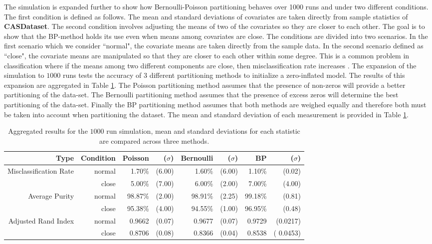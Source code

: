 \documentclass[11pt,letterpaper]{article}
\numberwithin{equation}{section}
\numberwithin{equation}{section}
\numberwithin{equation}{section}
\begin{document}
The simulation is expanded further to show how Bernoulli-Poisson partitioning behaves over 1000 runs and under two different conditions. The first condition is defined as follows. The mean and standard deviations of covariates are taken directly from sample statistics of \textbf{CASDataset}. The second condition involves adjusting the means of two of the covariates so they are closer to each other. The goal is to show that the BP-method holds its use even when means among covariates are close. The conditions are divided into two scenarios. In the first scenario which we consider ``normal", the covariate means are taken directly from the sample data. In the second scenario defined as ``close", the covariate means are manipulated so that they are closer to each other within some degree. This is a common problem in classification where if the means among two different components are close, then misclassification rate increases \citep{LimHwa}. The expansion of the simulation to $1000$ runs tests the accuracy of 3 different partitioning methods to initialize a zero-inflated model. The results of this expansion are aggregated in Table \ref{table:exper2}.  The Poisson partitioning method assumes that the presence of non-zeros will provide a better partitioning of the data-set. The Bernoulli partitioning method assumes that the presence of excess zeros will determine the best partitioning of the data-set. Finally the BP partitioning method assumes that both methods are weighed equally and therefore both must be taken into account when partitioning the dataset. The mean and standard deviation of each measurement is provided in Table \ref{table:exper2}.

\begin{table}[!htb]
\begin{center}
\caption{Aggregated results for the $1000$ run simulation, mean and standard deviations for each statistic are compared across three methods.}
\label{table:exper2}
\begin{tabular}{rrrrrrrr}
\hline\hline
Type   & Condition & Poisson & ($\sigma $) & Bernoulli & ($ \sigma $) & BP & ($ \sigma $) \\
\hline
Misclassification Rate& normal        & 1.70\% & (6.00)       & 1.60\%  & (6.00)         & 1.10\% & (0.02)         \\
       & close      & 5.00\% & (7.00)       & 6.00\% & (2.00)         & 7.00\% & (4.00)         \\
Average Purity & normal     & 98.87\% & (2.00)    & 98.91\% & (2.25)      & 99.18\% & (0.81)     \\
       & close       & 95.38\% & (4.00)    & 94.55\% & (1.00)      & 96.95\% & (0.48)      \\
Adjusted Rand Index  & normal      & 0.9662 & (0.07)    & 0.9677  & (0.07)     & 0.9729 & (0.0217)      \\
       & close         & 0.8706 & (0.08)    & 0.8366 & (0.04)      & 0.8538 & ( 0.0453) \\
       \hline\hline
\end{tabular}
\end{center}
\end{table}
\end{document}
